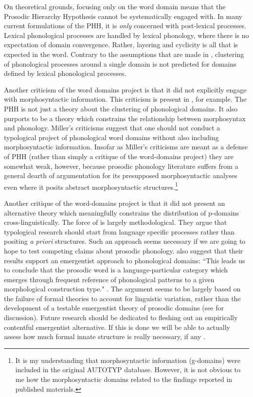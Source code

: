 \documentclass[output=paper,hidelinks]{langscibook}
\begin{document}
On theoretical grounds, focusing only on the word domain means that the Prosodic Hierarchy Hypothesis cannot be systematically engaged with. In many current formulations of the PHH, it is \textit{only} concerned with post-lexical processes. Lexical phonological processes are handled by lexical phonology, where there is no expectation of domain convergence. Rather, layering and cyclicity is all that is expected in the word. Contrary to the assumptions that are made in \citet{bickel2009distribution}, clustering of phonological processes around a single domain is not predicted for domains defined by lexical phonological processes. 

Another criticism of the word domains project is that it did not explicitly engage with morphosyntactic information. This criticism is present in \citet{miller2021is}, for example. The PHH is not just a theory about the clustering of phonological domains. It also purports to be a theory which constrains the relationship between morphosyntax and phonology. Miller's criticisms suggest that one should not conduct a typological project of phonological word domains without also including morphosyntactic information. Insofar as Miller's criticisms are meant as a defense of PHH (rather than simply a critique of the word-domains project) they are somewhat weak, however, because prosodic phonology literature suffers from a general dearth of argumentation for its presupposed morphosyntactic analyses even where it posits abstract morphosyntactic structures.\footnote{It is my understanding that morphosyntactic information (g-domains) were included in the original AUTOTYP database. However, it is not obvious to me how the morphosyntactic domains related to the findings reported in published materials.}

Another critique of the word-domains project is that it did not present an alternative theory which meaningfully constrains the distribution of p-domains cross-linguistically.
The force of \citet{bickel2015distributional, schiering2012stress, schiering2010prosodic} is largely methodological. They argue that typological research should start from language specific processes rather than positing \textit{a priori} structures. Such an approach seems necessary if we are going to hope to test competing claims about prosodic phonology. \citet{schiering2010prosodic} also suggest that their results support an emergentist approach to phonological domains: ``This leads us to conclude that the prosodic word is a language-particular category which emerges through frequent reference of phonological patterns to a given morphological construction type." \citep[705]{schiering2010prosodic}. The argument seems to be largely based on the failure of formal theories to account for linguistic variation, rather than the development of a testable emergentist theory of prosodic domains (see \cite{mielke2008emergence} for discussion). Future research should be dedicated to fleshing out an empirically contentful emergentist alternative. If this is done we will be able to actually assess how much formal innate structure is really necessary, if any \citep{Schmidtke-Bode2019}.  
\end{document}
